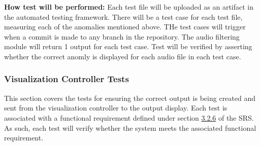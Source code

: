 \documentclass[12pt, titlepage]{article}
\begin{document}
\begin{enumerate}
\textbf{How test will be performed:}
Each test file will be uploaded as an artifact in the automated testing 
framework. There will be a test case for each test file, measuring each of the 
anomalies mentioned above. THe test cases will trigger when a commit is made to 
any branch in the repository. The audio filtering module will return 1 output 
for each test case. Test will be verified by asserting whether the correct 
anomly is displayed for each audio file in each test case. 

\end{enumerate}

\subsubsection{Visualization Controller Tests}

This section covers the tests for ensuring the correct output is being created 
and sent from the visualization controller to the output display. Each test is 
associated with a functional requirement defined under section 
\hyperref[SRS-sec:FR6]{3.2.6} of the SRS. As such, each test will verify whether
 the system meets the associated functional requirement. 
\end{document}
